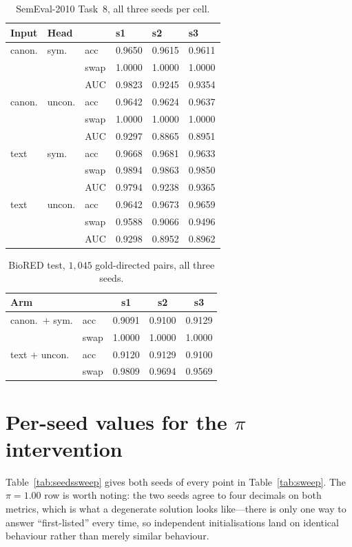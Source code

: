 \documentclass[11pt]{article}
\begin{document}
\begin{table}[h]
\centering\small
\begin{tabular}{llllll}
\toprule
Input & Head & & s1 & s2 & s3 \\
\midrule
canon. & sym.   & acc  & 0.9650 & 0.9615 & 0.9611 \\
       &        & swap & 1.0000 & 1.0000 & 1.0000 \\
       &        & AUC  & 0.9823 & 0.9245 & 0.9354 \\
\midrule
canon. & uncon. & acc  & 0.9642 & 0.9624 & 0.9637 \\
       &        & swap & 1.0000 & 1.0000 & 1.0000 \\
       &        & AUC  & 0.9297 & 0.8865 & 0.8951 \\
\midrule
text   & sym.   & acc  & 0.9668 & 0.9681 & 0.9633 \\
       &        & swap & 0.9894 & 0.9863 & 0.9850 \\
       &        & AUC  & 0.9794 & 0.9238 & 0.9365 \\
\midrule
text   & uncon. & acc  & 0.9642 & 0.9673 & 0.9659 \\
       &        & swap & 0.9588 & 0.9066 & 0.9496 \\
       &        & AUC  & 0.9298 & 0.8952 & 0.8962 \\
\bottomrule
\end{tabular}
\caption{SemEval-2010 Task~8, all three seeds per cell.}
\label{tab:seeds}
\end{table}

\begin{table}[h]
\centering\small
\begin{tabular}{llccc}
\toprule
Arm & & s1 & s2 & s3 \\
\midrule
canon.\ $+$ sym. & acc  & 0.9091 & 0.9100 & 0.9129 \\
                 & swap & 1.0000 & 1.0000 & 1.0000 \\
\midrule
text $+$ uncon.  & acc  & 0.9120 & 0.9129 & 0.9100 \\
                 & swap & 0.9809 & 0.9694 & 0.9569 \\
\bottomrule
\end{tabular}
\caption{BioRED test, $1{,}045$ gold-directed pairs, all three seeds.}
\label{tab:seedsbiored}
\end{table}

\section{Per-seed values for the $\pi$ intervention}
\label{app:sweep}
Table~\ref{tab:seedssweep} gives both seeds of every point in Table~\ref{tab:sweep}. The
$\pi = 1.00$ row is worth noting: the two seeds agree to four decimals on both metrics, which
is what a degenerate solution looks like---there is only one way to answer ``first-listed''
every time, so independent initialisations land on identical behaviour rather than merely
similar behaviour.
\end{document}
